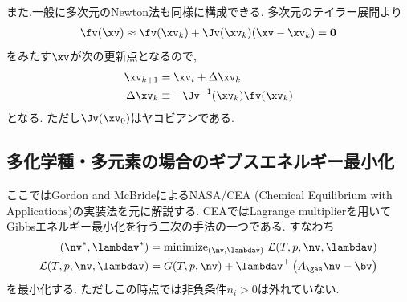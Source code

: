 また,一般に多次元のNewton法も同様に構成できる. 多次元のテイラー展開より
\begin{align}
\fv(\xv) \approx \fv(\xv_k) + \Jv (\xv_k) (\xv - \xv_k) = \boldsymbol{0}
\end{align}
をみたす$\xv$が次の更新点となるので,
\begin{align}
    \xv_{k+1} &= \xv_{i} + \Delta \xv_k \\
    \label{eq:newton_mdupdate}
    \Delta \xv_k &\equiv - \Jv^{-1} (\xv_k) \fv(\xv_k)
\end{align}
となる. ただし$\Jv (\xv_0)$はヤコビアンである. 

\subsection*{多化学種・多元素の場合のギブスエネルギー最小化}




ここではGordon and McBrideによるNASA/CEA (Chemical Equilibrium with Applications)の実装法を元に解説する\cite{gordon1994computer,2024arXiv241207166G}. CEAではLagrange multiplierを用いてGibbsエネルギー最小化を行う二次の手法の一つである. すなわち
\begin{align}
    (\nv^\ast, \lambdav^\ast)  &= \mathrm{minimize}_{(\nv,\lambdav)} \,\, \mathcal{L}(T, p, \nv, \lambdav) \\
    \mathcal{L}(T, p, \nv,\lambdav) &= G(T, p, \nv) + \lambdav^\top \left(A_\gas \nv - \bv\right)  
\end{align}
を最小化する. ただしこの時点では非負条件$n_i > 0$は外れていない. 

